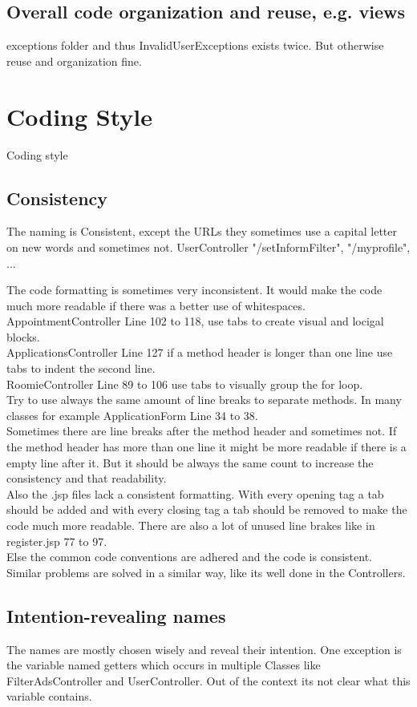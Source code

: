 \documentclass{scrreprt}
\begin{document}
\subsection{Overall code organization and reuse, e.g. views}
exceptions folder and thus InvalidUserExceptions exists twice. But otherwise reuse and organization fine.

\section{Coding Style}
Coding style

\subsection{Consistency}
The naming is Consistent, except the URLs they sometimes use a capital letter on new words and sometimes not. UserController "/setInformFilter", "/myprofile", ... 

The code formatting is sometimes very inconsistent. It would make the code much more readable if there was a better use of whitespaces. 
AppointmentController Line 102 to 118, use tabs to create visual and locigal blocks.\\
ApplicationsController Line 127 if a method header is longer than one line use tabs to indent the second line. \\
RoomieController Line 89 to 106 use tabs to visually group the for loop.\\
Try to use always the same amount of line breaks to separate methods. In many classes for example ApplicationForm Line 34 to 38.\\
Sometimes there are line breaks after the method header and sometimes not. If the method header has more than one line it might be more readable if there is a empty line after it. But it should be always the same count to increase the consistency and that readability.\\
Also the .jsp files lack a consistent formatting. With every opening tag a tab should be added and with every closing tag a tab should be removed to make the code much more readable. There are also a lot of unused line brakes like in register.jsp 77 to 97. \\

Else the common code conventions are adhered and the code is consistent. Similar problems are solved in a similar way, like its well done in the Controllers. 

\subsection{Intention-revealing names}
The names are mostly chosen wisely and reveal their intention.  One exception is the variable named getters which occurs in multiple Classes like FilterAdsController and UserController. Out of the context its not clear what this variable contains. 
\end{document}
